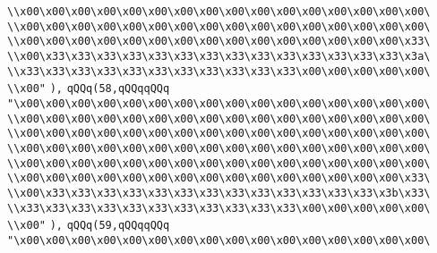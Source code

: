 \verb|\\x00\x00\x00\x00\x00\x00\x00\x00\x00\x00\x00\x00\x00\x00\x00\x00\|\newline
\verb|\\x00\x00\x00\x00\x00\x00\x00\x00\x00\x00\x00\x00\x00\x00\x00\x00\|\newline
\verb|\\x00\x00\x00\x00\x00\x00\x00\x00\x00\x00\x00\x00\x00\x00\x00\x33\|\newline
\verb|\\x00\x33\x33\x33\x33\x33\x33\x33\x33\x33\x33\x33\x33\x33\x33\x3a\|\newline
\verb|\\x33\x33\x33\x33\x33\x33\x33\x33\x33\x33\x33\x00\x00\x00\x00\x00\|\newline
\verb|\\x00"|\newline
\verb|),|\newline
\verb|qQQq(58,qQQqqQQq|\newline
\verb|"\x00\x00\x00\x00\x00\x00\x00\x00\x00\x00\x00\x00\x00\x00\x00\x00\|\newline
\verb|\\x00\x00\x00\x00\x00\x00\x00\x00\x00\x00\x00\x00\x00\x00\x00\x00\|\newline
\verb|\\x00\x00\x00\x00\x00\x00\x00\x00\x00\x00\x00\x00\x00\x00\x00\x00\|\newline
\verb|\\x00\x00\x00\x00\x00\x00\x00\x00\x00\x00\x00\x00\x00\x00\x00\x00\|\newline
\verb|\\x00\x00\x00\x00\x00\x00\x00\x00\x00\x00\x00\x00\x00\x00\x00\x00\|\newline
\verb|\\x00\x00\x00\x00\x00\x00\x00\x00\x00\x00\x00\x00\x00\x00\x00\x33\|\newline
\verb|\\x00\x33\x33\x33\x33\x33\x33\x33\x33\x33\x33\x33\x33\x33\x3b\x33\|\newline
\verb|\\x33\x33\x33\x33\x33\x33\x33\x33\x33\x33\x33\x00\x00\x00\x00\x00\|\newline
\verb|\\x00"|\newline
\verb|),|\newline
\verb|qQQq(59,qQQqqQQq|\newline
\verb|"\x00\x00\x00\x00\x00\x00\x00\x00\x00\x00\x00\x00\x00\x00\x00\x00\|\newline
